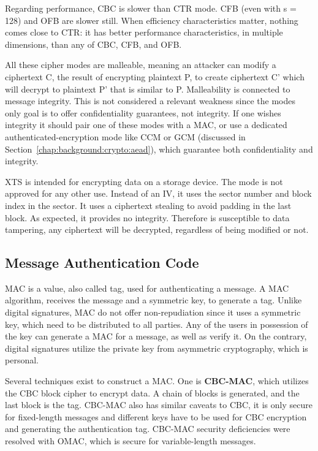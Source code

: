 Regarding performance, \ac{CBC} is slower than \ac{CTR} mode. \ac{CFB} (even with s = 128) and \ac{OFB} are slower still.
When efficiency characteristics matter, nothing comes close to \ac{CTR}: it has better performance characteristics, in multiple dimensions, than any of \ac{CBC}, \ac{CFB}, and \ac{OFB}.

All these cipher modes are malleable, meaning an attacker can modify a ciphertext C, the result of encrypting plaintext P, to create ciphertext C' which will decrypt to plaintext P' that is similar to P. Malleability is connected to message integrity. This is not considered a relevant weakness since the modes only goal is to offer confidentiality guarantees, not integrity. If one wishes integrity it should pair one of these modes with a \ac{MAC}, or use a dedicated authenticated-encryption mode like \ac{CCM} or \ac{GCM} (discussed in Section~\ref{chap:background:crypto:aead}), which guarantee both confidentiality and integrity.

\ac{XTS} is intended for encrypting data on a storage device. The mode is not approved for any other use. Instead of an IV, it uses the sector number and block index in the sector. It uses a ciphertext stealing to avoid padding in the last block. As expected, it provides no integrity. Therefore is susceptible to data tampering, any ciphertext will be decrypted, regardless of being modified or not.

\subsection{Message Authentication Code}\label{chap:background:crypto:mac}

\ac{MAC} is a value, also called tag, used for authenticating a message.
A \ac{MAC} algorithm, receives the message and a symmetric key, to generate a tag. Unlike digital signatures, \ac{MAC} do not offer non-repudiation since it uses a symmetric key, which need to be distributed to all parties. Any of the users in possession of the key can generate a \ac{MAC} for a message, as well as verify it. On the contrary, digital signatures utilize the private key from asymmetric cryptography, which is personal.

Several techniques exist to construct a \ac{MAC}. One is \textbf{\ac{CBC-MAC}}, which utilizes the \ac{CBC} block cipher to encrypt data. A chain of blocks is generated, and the last block is the tag.
\ac{CBC-MAC} also has similar caveats to \ac{CBC}, it is only secure for fixed-length messages \cite{aesmodes} and different keys have to be used for \ac{CBC} encryption and generating the authentication tag. 
\ac{CBC-MAC} security deficiencies were resolved with \ac{OMAC}, which is secure for variable-length messages.


